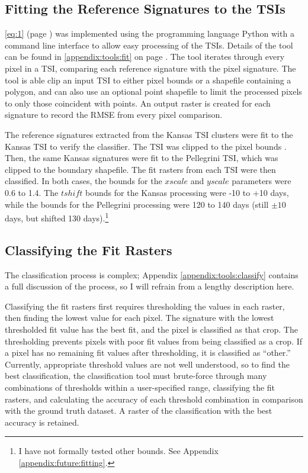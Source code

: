 \subsection{Fitting the Reference Signatures to the TSIs}

\autoref{eq:1} (page \pageref{eq:1}) was implemented using the programming language Python \autocite{python2.7.8} with a command line interface to allow easy processing of the TSIs. Details of the tool can be found in \autoref{appendix:tools:fit} on page \pageref{appendix:tools:fit}. The tool iterates through every pixel in a TSI, comparing each reference signature with the pixel signature. The tool is able clip an input TSI to either pixel bounds or a shapefile containing a polygon, and can also use an optional point shapefile to limit the processed pixels to only those coincident with points. An output raster is created for each signature to record the RMSE from every pixel comparison.

The reference signatures extracted from the Kansas TSI clusters were fit to the Kansas TSI to verify the classifier. The TSI was clipped to the pixel bounds . Then, the same Kansas signatures were fit to the Pellegrini TSI, which was clipped to the boundary shapefile. The fit rasters from each TSI were then classified. In both cases, the bounds for the $xscale$ and $yscale$ parameters were 0.6 to 1.4. The $tshift$ bounds for the Kansas processing were -10 to +10 days, while the bounds for the Pellegrini processing were 120 to 140 days (still $\pm10$ days, but shifted 130 days).\footnote{I have not formally tested other bounds. See Appendix \ref{appendix:future:fitting}.}

\subsection{Classifying the Fit Rasters}

The classification process is complex; Appendix \ref{appendix:tools:classify} contains a full discussion of the process, so I will refrain from a lengthy description here.

Classifying the fit rasters first requires thresholding the values in each raster, then finding the lowest value for each pixel. The signature with the lowest thresholded fit value has the best fit, and the pixel is classified as that crop. The thresholding prevents pixels with poor fit values from being classified as a crop. If a pixel has no remaining fit values after thresholding, it is classified as ``other.'' Currently, appropriate threshold values are not well understood, so to find the best classification, the classification tool must brute-force through many combinations of thresholds within a user-specified range, classifying the fit rasters, and calculating the accuracy of each threshold combination in comparison with the ground truth dataset. A raster of the classification with the best accuracy is retained.

